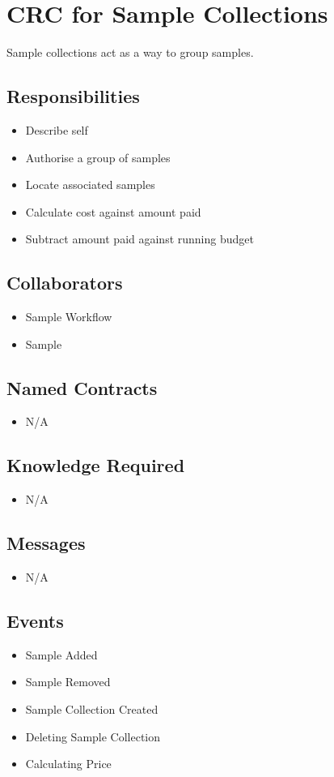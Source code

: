 \documentclass[11pt,twocolumn]{article}
\begin{document}
\section*{CRC for Sample Collections}
 Sample collections act as a way to group samples. 
\subsection*{Responsibilities}
\begin{itemize}
\item Describe self
\item Authorise a group of samples
\item Locate associated samples
\item Calculate cost against amount paid
\item Subtract amount paid against running budget
\end{itemize}

\subsection*{Collaborators}
\begin{itemize}
\item Sample Workflow
\item Sample
\end{itemize}

\subsection*{Named Contracts}
\begin{itemize}
\item N/A
\end{itemize}

\subsection*{Knowledge Required}
\begin{itemize}
\item N/A 
\end{itemize}

\subsection*{Messages}
\begin{itemize}
\item N/A
\end{itemize}

\subsection*{Events}
\begin{itemize}
\item Sample Added
\item Sample Removed
\item Sample Collection Created
\item Deleting Sample Collection
\item Calculating Price
\end{itemize}
\end{document}
